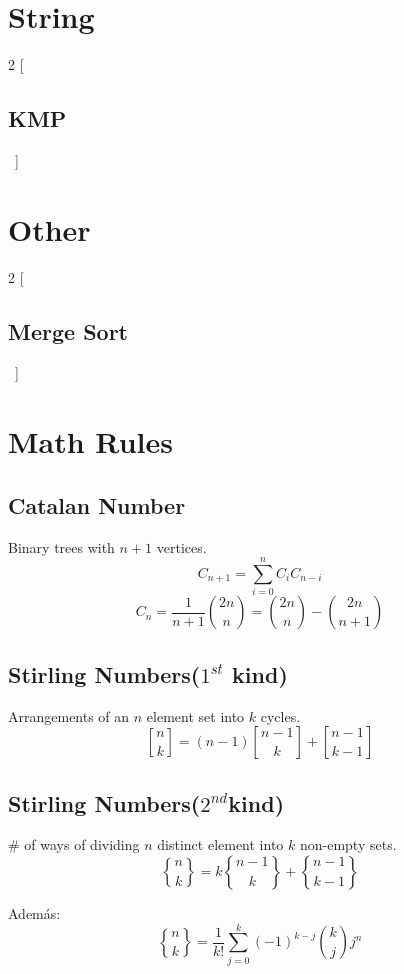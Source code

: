 \documentclass[a4paper]{amsart}
\newcommand{\includecpp}[3]{
  \begin{multicols}{2}
    [\subsection{#1}\ ]
    
  \end{multicols}
}
\newcommand{\stirlingfirst}[2]{\genfrac{[}{]}{0pt}{}{#1}{#2}}
\newcommand{\stirlingsecond}[2]{\genfrac{\{}{\}}{0pt}{}{#1}{#2}}
\begin{document}
  \section{String}
    \includecpp{KMP}{./String}{KMP.cpp}

  \section{Other}
    \includecpp{Merge Sort}{./Other}{Mergesort.cpp}
     
  \section{Math Rules}
    \subsection{Catalan Number}
    	Binary trees with $n+1$ vertices.
      \begin{equation*}
        C_{n+1} = \sum_{i=0}^nC_iC_{n-i}
      \end{equation*}
      \begin{equation*}
        C_n = \frac{1}{n+1}\binom{2n}{n} = \binom{2n}{n} - \binom{2n}{n+1}
      \end{equation*}
    \subsection{Stirling Numbers($1^{st}$ kind)} Arrangements of an $n$ element set into $k$ cycles.
      \begin{equation*}
        \stirlingfirst{n}{k} = (n-1)\stirlingfirst{n-1}{k} + \stirlingfirst{n-1}{k-1}
      \end{equation*}

    \subsection{Stirling Numbers($2^{nd}$kind)} \# of ways of dividing $n$ distinct element into $k$ non-empty sets.
      \begin{equation*}
        \stirlingsecond{n}{k} = k\stirlingsecond{n-1}{k} + \stirlingsecond{n-1}{k-1}
      \end{equation*}

      Además:
      \begin{equation*}
        \stirlingsecond{n}{k} = \frac{1}{k!}\sum_{j=0}^k (-1)^{k-j} \binom{k}{j} j^n
      \end{equation*}
\end{document}
